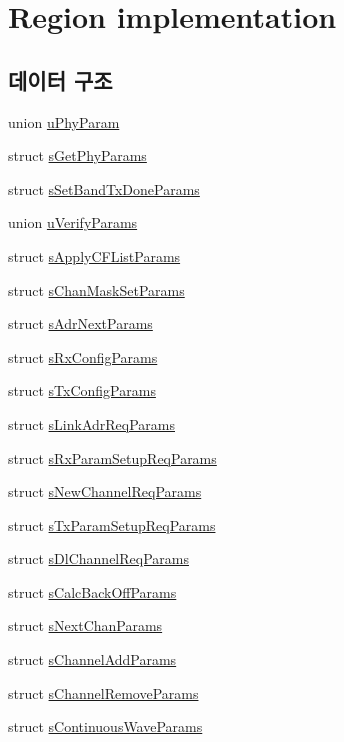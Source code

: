\hypertarget{group___r_e_g_i_o_n}{}\section{Region implementation}
\label{group___r_e_g_i_o_n}
\subsection*{데이터 구조}
\begin{DoxyCompactItemize}
\item 
union \mbox{\hyperlink{unionu_phy_param}{u\+Phy\+Param}}
\item 
struct \mbox{\hyperlink{structs_get_phy_params}{s\+Get\+Phy\+Params}}
\item 
struct \mbox{\hyperlink{structs_set_band_tx_done_params}{s\+Set\+Band\+Tx\+Done\+Params}}
\item 
union \mbox{\hyperlink{unionu_verify_params}{u\+Verify\+Params}}
\item 
struct \mbox{\hyperlink{structs_apply_c_f_list_params}{s\+Apply\+C\+F\+List\+Params}}
\item 
struct \mbox{\hyperlink{structs_chan_mask_set_params}{s\+Chan\+Mask\+Set\+Params}}
\item 
struct \mbox{\hyperlink{structs_adr_next_params}{s\+Adr\+Next\+Params}}
\item 
struct \mbox{\hyperlink{structs_rx_config_params}{s\+Rx\+Config\+Params}}
\item 
struct \mbox{\hyperlink{structs_tx_config_params}{s\+Tx\+Config\+Params}}
\item 
struct \mbox{\hyperlink{structs_link_adr_req_params}{s\+Link\+Adr\+Req\+Params}}
\item 
struct \mbox{\hyperlink{structs_rx_param_setup_req_params}{s\+Rx\+Param\+Setup\+Req\+Params}}
\item 
struct \mbox{\hyperlink{structs_new_channel_req_params}{s\+New\+Channel\+Req\+Params}}
\item 
struct \mbox{\hyperlink{structs_tx_param_setup_req_params}{s\+Tx\+Param\+Setup\+Req\+Params}}
\item 
struct \mbox{\hyperlink{structs_dl_channel_req_params}{s\+Dl\+Channel\+Req\+Params}}
\item 
struct \mbox{\hyperlink{structs_calc_back_off_params}{s\+Calc\+Back\+Off\+Params}}
\item 
struct \mbox{\hyperlink{structs_next_chan_params}{s\+Next\+Chan\+Params}}
\item 
struct \mbox{\hyperlink{structs_channel_add_params}{s\+Channel\+Add\+Params}}
\item 
struct \mbox{\hyperlink{structs_channel_remove_params}{s\+Channel\+Remove\+Params}}
\item 
struct \mbox{\hyperlink{structs_continuous_wave_params}{s\+Continuous\+Wave\+Params}}
\end{DoxyCompactItemize}

